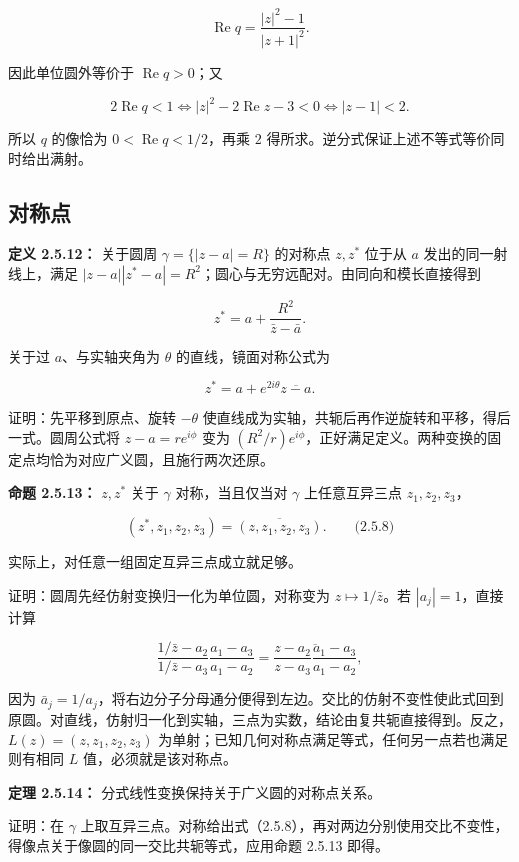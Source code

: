 \documentclass[11pt,a4paper]{article}
\begin{document}
\[
\operatorname{Re}q=\frac{|z|^2-1}{|z+1|^2}.
\]

因此单位圆外等价于 \(\operatorname{Re}q>0\)；又

\[
2\operatorname{Re}q<1\iff |z|^2-2\operatorname{Re}z-3<0
\iff |z-1|<2.
\]

所以 \(q\) 的像恰为 \(0<\operatorname{Re}q<1/2\)，再乘 \(2\)
得所求。逆分式保证上述不等式等价同时给出满射。

\subsection{对称点}\label{ch02-s5-ux5bf9ux79f0ux70b9}

\textbf{定义 2.5.12：} 关于圆周 \(\gamma=\{|z-a|=R\}\) 的对称点
\(z,z^*\) 位于从 \(a\) 发出的同一射线上，满足
\(|z-a||z^*-a|=R^2\)；圆心与无穷远配对。由同向和模长直接得到

\[
z^*=a+\frac{R^2}{\bar z-\bar a}.
\]

关于过 \(a\)、与实轴夹角为 \(\theta\) 的直线，镜面对称公式为

\[
z^*=a+e^{2i\theta}\overline{z-a}.
\]

证明：先平移到原点、旋转 \(-\theta\)
使直线成为实轴，共轭后再作逆旋转和平移，得后一式。圆周公式将
\(z-a=re^{i\phi}\) 变为
\((R^2/r)e^{i\phi}\)，正好满足定义。两种变换的固定点均恰为对应广义圆，且施行两次还原。

\textbf{命题 2.5.13：} \(z,z^*\) 关于 \(\gamma\) 对称，当且仅当对
\(\gamma\) 上任意互异三点 \(z_1,z_2,z_3\)，

\[
(z^*,z_1,z_2,z_3)=\overline{(z,z_1,z_2,z_3)}.
\qquad\text{(2.5.8)}
\]

实际上，对任意一组固定互异三点成立就足够。

证明：圆周先经仿射变换归一化为单位圆，对称变为 \(z\mapsto1/\bar z\)。若
\(|a_j|=1\)，直接计算

\[
\frac{1/\bar z-a_2}{1/\bar z-a_3}\frac{a_1-a_3}{a_1-a_2}
=\overline{\frac{z-a_2}{z-a_3}\frac{a_1-a_3}{a_1-a_2}},
\]

因为
\(\bar a_j=1/a_j\)，将右边分子分母通分便得到左边。交比的仿射不变性使此式回到原圆。对直线，仿射归一化到实轴，三点为实数，结论由复共轭直接得到。反之，\(L(z)=(z,z_1,z_2,z_3)\)
为单射；已知几何对称点满足等式，任何另一点若也满足则有相同 \(L\)
值，必须就是该对称点。

\textbf{定理 2.5.14：} 分式线性变换保持关于广义圆的对称点关系。

证明：在 \(\gamma\)
上取互异三点。对称给出式（2.5.8），再对两边分别使用交比不变性，得像点关于像圆的同一交比共轭等式，应用命题
2.5.13 即得。
\end{document}
